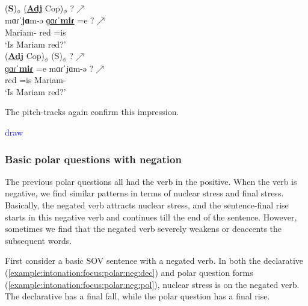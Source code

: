 \begin{exe}
	\ex \begin{xlist}
		\ex \glll   (\textbf{S})$_\phi$ (\underline{\textbf{Adj}} Cop)$_\phi$ ?$\nearrow$ \\
		mɑɾˈ\textbf{jɑ}m-ə {\underline{ɡɑɾˈ\textbf{miɾ}}} =e  ?$\nearrow$ \\
		Mariam-{} red   =is \\ 
		\trans `Is Mariam    red?' 
		\label{example:intonation:focus:polar:otherorder:enc:sov}
		\\ 
		\ex \glll (\underline{\textbf{Adj}} Cop)$_\phi$    ({S})$_\phi$  ?$\nearrow$ \\
		{\underline{ɡɑɾˈ\textbf{miɾ}}} =e  mɑɾˈ{jɑ}m-ə  ?$\nearrow$ \\
		red   =is  Mariam-{}  \\ 
		\trans `Is Mariam    red?' 
		\label{example:intonation:focus:polar:otherorder:enc:ovs}
		\\ 
		
	\end{xlist}
\end{exe}

The pitch-tracks again confirm this impression. 

\textcolor{blue}{draw}



\subsubsection{Basic polar questions with negation} \label{section:intonation:focus:polar:negation}
The previous polar questions all had the verb in the positive. When the verb is negative, we find similar patterns in terms of nuclear stress and final stress. Basically, the negated verb attracts nuclear stress, and the sentence-final rise starts in this negative verb and continues till the end of the sentence. However, sometimes we find that the negated verb severely weakens or deaccents the subsequent words. 


First consider a basic SOV sentence with a negated verb. In both the declarative (\ref{example:intonation:focus:polar:neg:dec}) and polar question forms (\ref{example:intonation:focus:polar:neg:pol}),  nuclear stress is on the negated verb. The declarative has a final fall, while the polar question has a final rise. 

